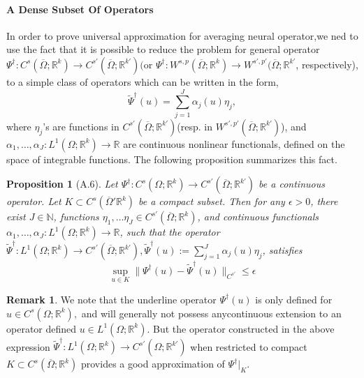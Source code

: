 \documentclass[reqno]{amsart}
\theoremstyle{plain}
\newtheorem{prop}{Proposition}
\theoremstyle{definition}
\newtheorem{rem}{Remark}
\newcommand{\bb}[1]{\mathbb{#1}}
\begin{document}
\paragraph{\bf A Dense Subset Of Operators}
In order to prove universal approximation for averaging neural operator,we ned to use the fact that it is possible to reduce the problem for general operator $\Psi^\dag :C^s(\overline{\Omega};\bb R^k) \to C^{s'}(\overline{\Omega};\bb R^{k'})($or $\Psi^\dag :W^{s,p}(\overline{\Omega};\bb R^k) \to W^{s',p'}(\overline{\Omega};\bb R^{k'}$, respectively), to a simple class of operators which can be written in the form,
$$ \tilde{\Psi}^\dag(u) = \sum\limits_{j=1}^{J}\alpha_j(u)\eta_j,$$
where $\eta_j$'s are functions in $C^{s'}(\overline{\Omega};\bb R^{k'})$(resp. in $W^{s',p'}(\overline{\Omega};\bb R^{k'})$), and $\alpha_1,\dots,\alpha_J:L^1(\Omega;\bb R^k) \to \bb R$ are continuous nonlinear functionals, defined on the space of integrable functions. The following proposition summarizes this fact.
\begin{prop}[A.6] \label{A.6}
    Let $\Psi^\dag : C^s(\Omega;\bb R^k) \to C^{s'}(\overline{\Omega};\bb R^{k'})$ be a continuous operator. Let $K \subset C^s(\overline{\Omega}'\bb R^k)$ be a compact subset. Then for any $\epsilon > 0$, there exist $J \in \bb N$, functions $\eta_1,\dots \eta_J \in C^{s'}(\overline{\Omega};\bb R^k)$, and continuous functionals $\alpha_1, \dots, \alpha_J:L^1(\Omega;\bb R^k) \to \bb R$, such that the operator $\tilde{\Psi}^\dag : L^1(\Omega;\bb R^k) \to C^{s'}(\overline{\Omega};\bb R^{k'}), \tilde{\Psi}^\dag(u) := \sum\limits_{j=1}^{J}\alpha_j(u)\eta_j$, satisfies
    $$ \sup\limits_{u \in K}\|\Psi^\dag(u) - \tilde{\Psi}^\dag(u)\|_{C^{s'}} \leq \epsilon$$
\end{prop}
\begin{rem}
    We note that the underline operator $\Psi^\dag(u)$ is only defined for $u \in C^s(\Omega;\bb R^k),$ and will generally not possess anycontinuous extension to an operator defined $u \in L^1(\Omega;\bb R^k)$. But the operator constructed in the above expression $\tilde{\Psi}^\dag : L^1(\Omega;\bb R^k) \to C^{s'}(\Omega;\bb R^{k'})$ when restricted to compact $K \subset C^s(\overline{\Omega};\bb R^k)$ provides a good approximation of $\Psi^\dag |_K$.
\end{rem}
\end{document}
